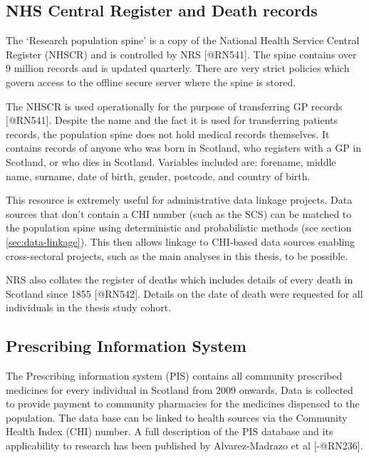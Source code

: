 \documentclass[]{article}
\begin{document}
\subsection{NHS Central Register and Death records}\label{subsec:source-nhscr}

The `Research population spine' is a copy of the National Health Service
Central Register (NHSCR) and is controlled by NRS {[}@RN541{]}. The
spine contains over 9 million records and is updated quarterly. There
are very strict policies which govern access to the offline secure
server where the spine is stored.

The NHSCR is used operationally for the purpose of transferring GP
records {[}@RN541{]}. Despite the name and the fact it is used for
transferring patients records, the population spine does not hold
medical records themselves. It contains records of anyone who was born
in Scotland, who registers with a GP in Scotland, or who dies in
Scotland. Variables included are: forename, middle name, surname, date
of birth, gender, postcode, and country of birth.

This resource is extremely useful for administrative data linkage
projects. Data sources that don't contain a CHI number (such as the SCS)
can be matched to the population spine using deterministic and
probabilistic methods (see section \ref{sec:data-linkage}). This then
allows linkage to CHI-based data sources enabling cross-sectoral
projects, such as the main analyses in this thesis, to be possible.

NRS also collates the register of deaths which includes details of every
death in Scotland since 1855 {[}@RN542{]}. Details on the date of death
were requested for all individuals in the thesis study cohort.

\subsection{Prescribing Information System}\label{subsec:source-pis}

The Prescribing information system (PIS) contains all community
prescribed medicines for every individual in Scotland from 2009 onwards.
Data is collected to provide payment to community pharmacies for the
medicines dispensed to the population. The data base can be linked to
health sources via the Community Health Index (CHI) number. A full
description of the PIS database and its applicability to research has
been published by Alvarez-Madrazo et al {[}-@RN236{]}.
\end{document}
